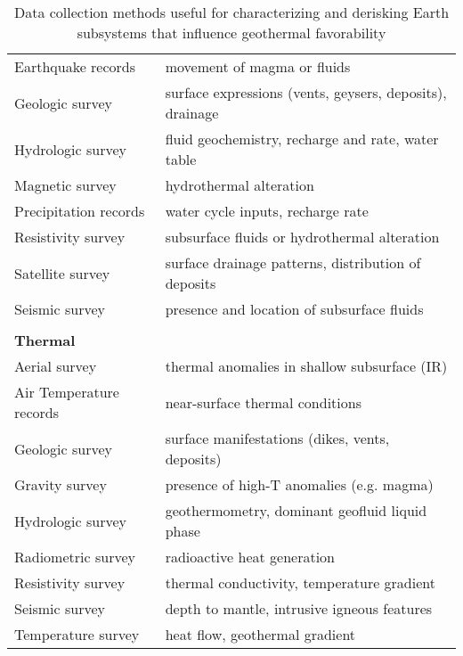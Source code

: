 \begin{table}[!htp]
\begin{tabular}{ll}
Earthquake records      & movement of magma or fluids                              \\
Geologic survey         & surface expressions (vents, geysers, deposits), drainage \\
Hydrologic survey       & fluid geochemistry, recharge and rate, water table       \\
Magnetic survey         & hydrothermal alteration                                  \\
Precipitation records   & water cycle inputs, recharge rate                        \\
Resistivity survey      & subsurface fluids or hydrothermal alteration             \\
Satellite survey        & surface drainage patterns, distribution of deposits      \\
Seismic survey          & presence and location of subsurface fluids               \\
                        &                                                          \\
\textbf{Thermal}        &                                                          \\ \hline
Aerial survey           & thermal anomalies in shallow subsurface (IR)             \\
Air Temperature records & near-surface thermal conditions                          \\
Geologic survey         & surface manifestations (dikes, vents, deposits)          \\
Gravity survey          & presence of high-T anomalies (e.g. magma)                \\
Hydrologic survey       & geothermometry, dominant geofluid liquid phase           \\
Radiometric survey      & radioactive heat generation                              \\
Resistivity survey      & thermal conductivity, temperature gradient               \\
Seismic survey          & depth to mantle, intrusive igneous features              \\
Temperature survey      & heat flow, geothermal gradient                          
\end{tabular}
\caption[Data collection methods for geothermal derisking]{Data collection methods useful for characterizing and derisking Earth subsystems that influence geothermal favorability}
\label{tab:surveytypes}
\end{table}


